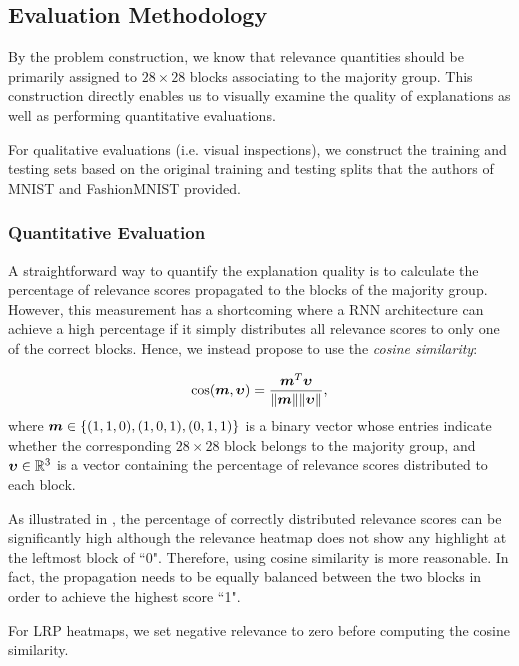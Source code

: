 \subsection{Evaluation Methodology}
\label{sec:evaluation_med}
By the problem construction, we know that relevance quantities should  be primarily assigned to $28\times28$ blocks associating to the majority group. This construction directly enables us to visually examine the quality of explanations as well as performing quantitative evaluations.  

For qualitative evaluations (i.e. visual inspections), we construct the training and testing sets based on the original training and testing splits that the authors of MNIST \citep{LeCunMNISThandwrittendigit2010} and FashionMNIST \citep{XiaoFashionMNISTNovelImage2017} provided.

\subsubsection{Quantitative Evaluation}
A straightforward way to quantify the explanation quality is to calculate the percentage of relevance scores propagated to the blocks of the majority group. However, this measurement has a shortcoming where a RNN architecture can achieve a high percentage if it simply distributes all relevance scores to only one of the correct blocks. Hence, we instead propose to use the \textit{cosine similarity}:


\begin{align*}
\cos (\patvector{m}, \patvector{\upsilon}) = \frac{ \patvector{m}^T \patvector{\upsilon}}{ \| \patvector{m}  \| \|\patvector{\upsilon}   \|},	
\end{align*}
where $\patvector{m} \in \{(1,1,0), (1,0,1), (0, 1, 1) \} $ is a binary vector whose entries indicate whether the corresponding $28\times28$ block belongs to the majority group, and $\patvector{\upsilon} \in \mathbb{R}^3$ is a vector containing the percentage of  relevance scores distributed to each block. 


As illustrated in \addfigure{\ref{fig:quantitative_evaluation}}, the percentage of correctly distributed relevance scores can be significantly high although the relevance heatmap does not show any highlight at the leftmost block of ``0". Therefore, using cosine similarity is more reasonable. In fact, the propagation needs to be equally balanced between the two blocks in order to achieve the highest score ``1". 

For LRP heatmaps, we set negative relevance to zero before computing the cosine similarity.

